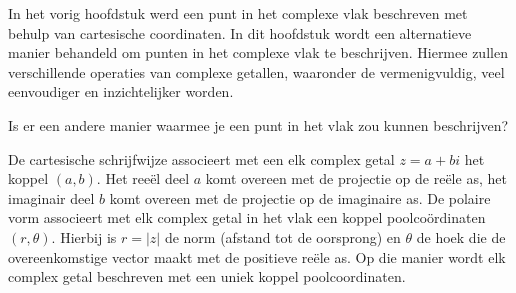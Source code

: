 \documentclass{ximera}
\begin{document}
    \author{Wiskunde Op Maat }
     
    \label{xim:complexe_getallen_polair}  %
 



In het vorig hoofdstuk werd een punt in het complexe vlak beschreven met behulp van cartesische coordinaten.  In dit hoofdstuk wordt een alternatieve manier behandeld om punten in het complexe vlak te beschrijven. Hiermee zullen verschillende operaties van complexe getallen, waaronder de vermenigvuldig, veel eenvoudiger en inzichtelijker worden. 

\begin{quickquestion*}{}
    Is er een andere manier waarmee je een punt in het vlak zou kunnen beschrijven? 
\end{quickquestion*}

 
De cartesische schrijfwijze associeert met een elk complex getal $z=a+bi$ het koppel \((a, b)\). Het reeël deel \(a\) komt overeen met de projectie op de reële as, het imaginair deel \(b\) komt overeen met de projectie op de imaginaire as. De polaire vorm associeert met elk complex getal in het vlak een koppel poolcoördinaten \((r, \theta)\).  Hierbij is $r=|z|$ de norm (afstand tot de oorsprong) en $\theta$ de hoek die de overeenkomstige vector maakt met de positieve reële as. Op die manier wordt elk complex getal beschreven met een uniek koppel poolcoordinaten. 
\end{document}
